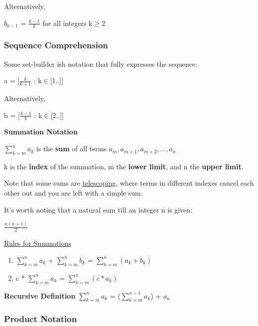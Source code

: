 \documentclass{article}
\newcommand{\sub}[1]{\vspace{10pt}\textbf{#1}}
\newcommand{\sbreak}{\vspace{10pt}}
\begin{document}
Alternatively,

\begin{center}
    $b_{k-1}$ = $\frac{k-1}{k}$ for all integers k$\geq$2
\end{center}

\subsubsection{Sequence Comprehension}

Some set-builder ish notation that fully expresses the sequence:

\begin{center}
    a = [$\frac{k}{k+1}$ : k$\in$[1..]]
\end{center}
Alternatively,
\begin{center}
    b = [$\frac{k-1}{k}$ : k$\in$[2..]]
\end{center}

\sub{Summation Notation}

$\sum_{k=m}^{n} a_k$ is the \textbf{sum} of all terms $a_m, a_{m+1}, a_{m+2},...,a_n$

\sbreak

k is the \textbf{index} of the summation, m the \textbf{lower limit}, and n the \textbf{upper limit}.

\sbreak

Note that some sums are \underline{telescoping}, where terms in different indexes cancel each other out and you are left with a simple sum.

\sbreak

It's worth noting that a natural sum till an integer n is given:
\begin{center}
    $\frac{n(n+1)}{2}$
\end{center}

\underline{Rules for Summations}
\begin{enumerate}
    \item $\sum_{k=m}^{n} a_k$ + $\sum_{k=m}^{n} b_k$ = $\sum_{k=m}^{n} (a_k + b_k)$
    \item c * $\sum_{k=m}^{n} a_k$ = $\sum_{k=m}^{n} (c * a_k)$
\end{enumerate}

\sub{Recursive Definition}
$\sum_{k=m}^{n} a_k$ = ($\sum_{k=m}^{n-1} a_k$) + $a_n$

\subsubsection{Product Notation}
\end{document}
